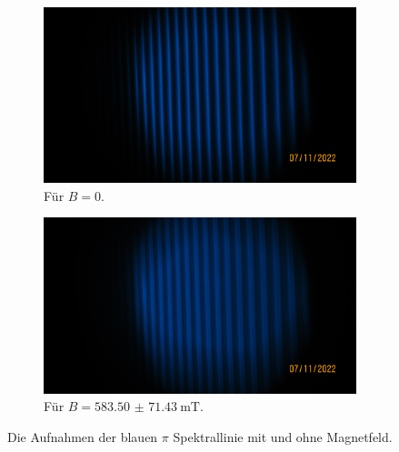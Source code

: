     \begin{figure}%
      \begin{subfigure}{0.48\textwidth}%
        \centering%
        \includegraphics{../pictures/IMG_0009.JPG}%
        \caption{Für $B = \num{0}$.}%
        \label{fig:pic_blaup_0}%
      \end{subfigure}%
      \hfill%
      \begin{subfigure}{0.48}%
        \centering%
        \includegraphics{../pictures/IMG_0010.JPG}%
        \caption{Für $B = \SI{583.50(7143)}{\milli\tesla}$.}%
        \label{fig:pic_blaup_B}%
      \end{subfigure}%
      \caption{Die Aufnahmen der blauen $\pi$ Spektrallinie mit und ohne Magnetfeld.}%
      \label{fig:blaup}%
    \end{figure}

